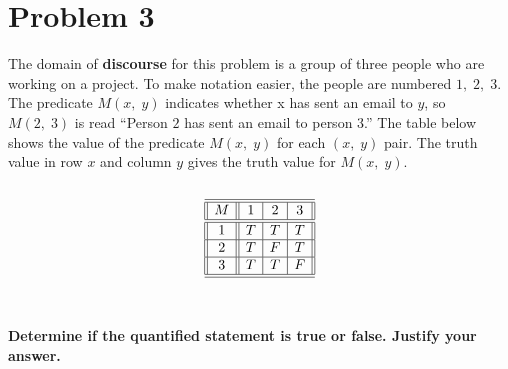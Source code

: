 \newpage




\section*{Problem 3}

The domain of {\bf discourse} for this problem is a group of three people who are working on a project. To make notation easier, the people are numbered $1, \;2, \;3$. The predicate $M(x,\; y)$ indicates whether x has sent an email to $y$, so $M(2, \;3)$ is read ``Person $2$ has sent an email to person $3$.'' The table below shows the value of the predicate $M(x,\;y)$ for each $(x,\;y)$ pair. The truth value in row $x$ and column $y$ gives the truth value for $M(x,\;y)$.\\\\
\[
 \begin{array}{||c||c|c|c||}
\hline\hline
M & 1 & 2& 3\\
\hline\hline
1 &T & T & T\\
\hline
2 &T & F & T\\
\hline
3 &T & T & F\\
\hline\hline
    \end{array}
    \]\\\\
{\bf Determine if the quantified statement is true or false. Justify your answer.}\\

